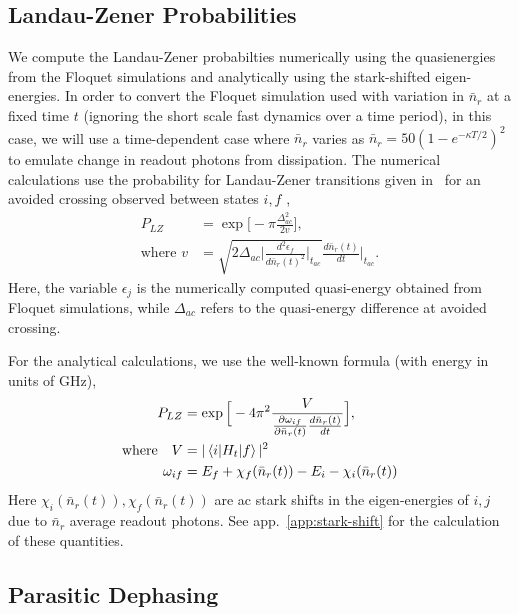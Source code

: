 \documentclass[%
reprint,
superscriptaddress,
 amsmath,amssymb,
 aps,
 prx,
longbibliography,
floatfix,
]{revtex4-2}
\begin{document}
\subsection{Landau-Zener Probabilities}\label{app:LZ}
We compute the Landau-Zener probabilties numerically using the quasienergies from the Floquet simulations and analytically using the stark-shifted eigen-energies. In order to convert the Floquet simulation used with variation in $\bar n_r$ at a fixed time $t$ (ignoring the short scale fast dynamics over a time period), in this case, we will use a time-dependent case where $\bar n_r$ varies as $\bar n_r=50(1-e^{-\kappa T/2})^2$ to emulate change in readout photons from dissipation. The numerical calculations use the probability for Landau-Zener transitions given in~\cite{ikeda2022floquet} for an avoided crossing observed between states $i,f$ ,
\begin{align}
    P_{LZ}&=\exp{\Big[-\pi \frac{\Delta_{ac}^2}{2v}\Big]},\\
    \text{where } v&=\sqrt{2\Delta_{ac}\Big|\frac{d^2\epsilon_f}{d\bar{n}_r(t)^2}\Big|_{t_{ac}}}\frac{d\bar{n}_r(t)}{dt}|_{t_{ac}}\Big.
\end{align}
Here, the variable $\epsilon_j$ is the numerically computed quasi-energy obtained from Floquet simulations, while $\Delta_{ac}$ refers to the quasi-energy difference at avoided crossing.

For the analytical calculations, we use the well-known formula (with energy in units of GHz), 
\begin{align}
    P_{LZ}&=\exp{\Big[-4\pi^2 \frac{V}{\frac{\partial\omega_{if}}{\partial\bar n_r(t)}\frac{d\bar n_r(t)}{dt}}\Big]},\\
    \text{where}\quad V&=|\braket{i|H_{t}|f}|^2\\
    \omega_{if}&=E_f+\chi_f(\bar n_r(t))-E_i-\chi_i(\bar n_r(t))
\end{align}
Here $\chi_i(\bar n_r(t)), \chi_f(\bar n_r(t))$ are ac stark shifts in the eigen-energies of $i,j$ due to $\bar n_r$ average readout photons. See app.~\ref{app:stark-shift} for the calculation of these quantities.
\subsection{Parasitic Dephasing}\label{app:dephasing}
\end{document}
